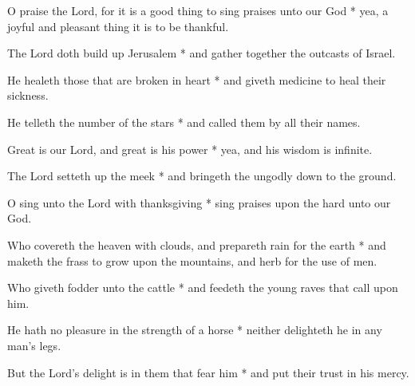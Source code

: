 \begin{multicols}{2}
	
	O praise the Lord, for it is a good thing to sing praises unto our God * yea, a joyful and pleasant thing it is to be thankful.
	
	The Lord doth build up Jerusalem * and gather together the outcasts of Israel.
	
	He healeth those that are broken in heart * and giveth medicine to heal their sickness.
	
	He telleth the number of the stars * and called them by all their names.
	
	Great is our Lord, and great is his power * yea, and his wisdom is infinite.
	
	The Lord setteth up the meek * and bringeth the ungodly down to the ground.
	
	O sing unto the Lord with thanksgiving * sing praises upon the hard unto our God.
	
	Who covereth the heaven with clouds, and prepareth rain for the earth * and maketh the frass to grow upon the mountains, and herb for the use of men.
	
	Who giveth fodder unto the cattle * and feedeth the young raves that call upon him.
	
	He hath no pleasure in the strength of a horse * neither delighteth he in any man's legs.
	
	But the Lord's delight is in them that fear him * and put their trust in his mercy.
	
	\gloria{}
\end{multicols}